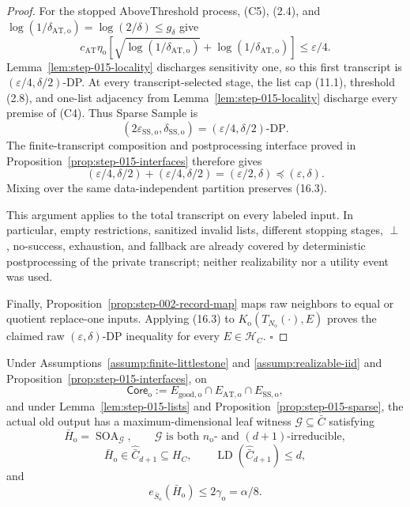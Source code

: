 \begin{proof}
For the stopped AboveThreshold process, (C5), (2.4), and
\(\log(1/\delta_{\mathrm{AT,o}})=\log(2/\delta)\le g_\delta\) give
\[
c_{\mathrm{AT}}\eta_{\mathrm o}
[\sqrt{\log(1/\delta_{\mathrm{AT,o}})}
+\log(1/\delta_{\mathrm{AT,o}})]
\le\varepsilon/4.
\tag{16.1}
\]
Lemma~\ref{lem:step-015-locality} discharges sensitivity one, so this first
transcript is \((\varepsilon/4,\delta/2)\)-DP. At every transcript-selected
stage, the list cap (11.1), threshold (2.8), and one-list adjacency
from Lemma~\ref{lem:step-015-locality} discharge every premise of (C4).
Thus Sparse Sample is
\[
(2\varepsilon_{\mathrm{SS,o}},\delta_{\mathrm{SS,o}})
=(\varepsilon/4,\delta/2)\text{-DP}.
\tag{16.2}
\]
The finite-transcript composition and postprocessing interface proved in
Proposition~\ref{prop:step-015-interfaces} therefore gives
\[
(\varepsilon/4,\delta/2)+(\varepsilon/4,\delta/2)
=(\varepsilon/2,\delta)\preceq(\varepsilon,\delta).
\tag{16.3}
\]
Mixing over the same data-independent partition preserves (16.3).

This argument applies to the total transcript on every labeled input.
In particular, empty restrictions, sanitized invalid lists, different
stopping stages, \(\perp\), no-success, exhaustion, and fallback are
already covered by deterministic postprocessing of the private transcript;
neither realizability nor a utility event was used.

Finally, Proposition~\ref{prop:step-002-record-map} maps raw
neighbors to equal or quotient replace-one inputs. Applying (16.3) to
\(K_{\mathrm o}(T_{N_{\mathrm o}}(\cdot),E)\) proves the claimed raw
\((\varepsilon,\delta)\)-DP inequality for every
\(E\in\mathcal H_C\). \(\square\)


\end{proof}

\begin{proposition}\label{prop:step-015-soa}
Under Assumptions~\ref{assump:finite-littlestone} and
\ref{assump:realizable-iid} and
Proposition~\ref{prop:step-015-interfaces}, on
\[
\mathsf{Core}_{\mathrm o}:=
E_{\mathrm{good,o}}\cap E_{\mathrm{AT,o}}\cap E_{\mathrm{SS,o}},
\tag{17.1}
\]
and under Lemma~\ref{lem:step-015-lists} and
Proposition~\ref{prop:step-015-sparse}, the actual old output has a
maximum-dimensional leaf witness \(\mathcal G\subseteq\bar C\) satisfying
\[
\bar H_{\mathrm o}=\operatorname{SOA}_{\mathcal G},\qquad
\mathcal G\text{ is both }n_{\mathrm o}\text{- and }
(d+1)\text{-irreducible},
\tag{17.2}
\]
\[
\bar H_{\mathrm o}\in\widehat{\bar C}_{d+1}\subseteq H_C,\qquad
\operatorname{LD}(\widehat{\bar C}_{d+1})\le d,
\tag{17.3}
\]
and
\[
e_{\bar S_{\mathrm o}}(\bar H_{\mathrm o})
\le2\gamma_{\mathrm o}=\alpha/8.
\tag{17.4}
\]


\end{proposition}

